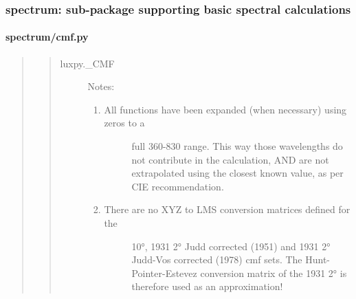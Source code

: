 \documentclass[letterpaper,10pt,english]{sphinxmanual}
\begin{document}
\subsubsection{spectrum: sub-package supporting basic spectral calculations}
\label{\detokenize{spectrum:spectrum-sub-package-supporting-basic-spectral-calculations}}

\paragraph{spectrum/cmf.py}
\label{\detokenize{spectrum:spectrum-cmf-py}}\begin{quote}
\begin{quote}\begin{description}
\item[{luxpy.\_CMF}] \leavevmode
{}


Notes:
\begin{enumerate}
\item {} \begin{description}
\item[{All functions have been expanded (when necessary) using zeros to a }] \leavevmode
full 360-830 range. This way those wavelengths do not contribute 
in the calculation, AND are not extrapolated using the closest 
known value, as per CIE recommendation.

\end{description}

\item {} \begin{description}
\item[{There are no XYZ to LMS conversion matrices defined for the }]  10°, 1931 2° Judd corrected (1951) 
and 1931 2° Judd-Vos corrected (1978) cmf sets.
The Hunt-Pointer-Estevez conversion matrix of the 1931 2° is 
therefore used as an approximation!


\end{description}
\end{enumerate}
\end{description}
\end{quote}
\end{quote}
\end{document}
